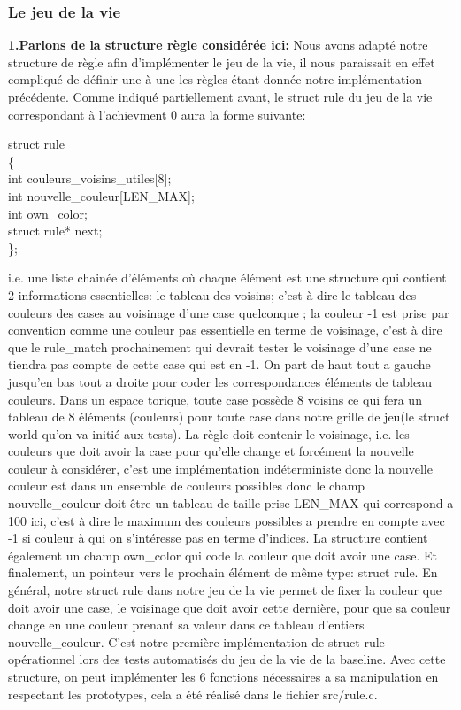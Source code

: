 \documentclass{article}
\begin{document}
{{        \subsubsection{Le jeu de la vie}
        {
        \textbf{1.Parlons de la structure règle considérée ici: \newline}
        Nous avons adapté notre structure de règle afin d'implémenter le jeu de la vie, il nous paraissait en effet compliqué de définir une à une les règles étant donnée notre implémentation précédente. Comme indiqué partiellement avant, le struct rule du jeu de la vie correspondant à l'achievment 0 aura la forme suivante:
        \begin{center}
        struct rule \\ \{ \\
        int couleurs\_voisins\_utiles[8];\\
        int nouvelle\_couleur[LEN\_MAX];\\
        int own\_color;\\
        struct rule* next;\\
        \};\\
        \end{center}
        i.e. une liste chainée d'éléments où chaque élément est une structure qui contient 2 informations essentielles: le tableau des voisins; c'est à dire le tableau des couleurs des cases au voisinage d'une case quelconque ; la couleur -1 est prise par convention comme une couleur pas essentielle en terme de voisinage, c'est à dire que le rule\_match prochainement qui devrait tester le voisinage d'une case ne tiendra pas compte de cette case qui est en -1. On part de haut tout a gauche jusqu'en bas tout a droite pour coder les correspondances éléments de tableau ~ couleurs. Dans un espace torique, toute case possède 8 voisins ce qui fera un tableau de 8 éléments (couleurs) pour toute case dans notre grille de jeu(le struct world qu'on va initié aux tests). La règle doit contenir le voisinage, i.e. les couleurs que doit avoir la case pour qu'elle change et forcément la nouvelle couleur à considérer, c'est une implémentation indéterministe donc la nouvelle couleur est dans un ensemble de couleurs possibles donc le champ nouvelle\_couleur doit être un tableau de taille prise LEN\_MAX qui correspond a 100 ici, c'est à dire le maximum des couleurs possibles a prendre en compte avec -1 si couleur à qui on s'intéresse pas en terme d'indices. La structure contient également un champ own\_color qui code la couleur que doit avoir une case. Et finalement, un pointeur vers le prochain élément de même type: struct rule. En général, notre struct rule dans notre jeu de la vie permet de fixer la couleur que doit avoir une case, le voisinage que doit avoir cette dernière, pour que sa couleur change en une couleur prenant sa valeur dans ce tableau d'entiers nouvelle\_couleur. C'est notre première implémentation de struct rule opérationnel lors des tests automatisés du jeu de la vie de la baseline. Avec cette structure, on peut implémenter les 6 fonctions nécessaires a sa manipulation en respectant les prototypes, cela a été réalisé dans le fichier src/rule.c.\\
}}}
\end{document}
